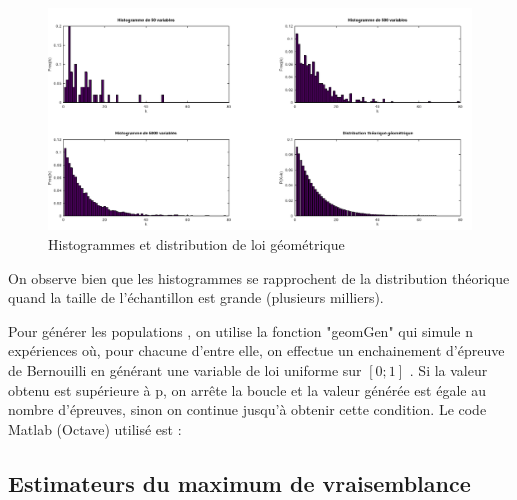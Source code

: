 \documentclass[12pt,a4paper,titlepage]{article}
\begin{document}
\begin{figure}[!h]
\begin{center}
 \includegraphics[scale=0.3]{images/histGeom.png} 
\end{center}
 \caption{Histogrammes et distribution de loi géométrique}
 \label{Histogrammes et distribution de loi géométrique}
\end{figure}

On observe bien que les histogrammes se rapprochent de la distribution théorique quand
la taille de l'échantillon est grande (plusieurs milliers).

Pour générer les populations , on utilise la fonction "geomGen" qui simule
n expériences où, pour chacune d'entre elle, on effectue un enchainement
d'épreuve de Bernouilli en générant une variable de loi uniforme sur
$[0;1]$ . Si la valeur obtenu est supérieure à p, on arrête la boucle
et la valeur générée est égale au nombre d'épreuves, sinon on continue 
jusqu'à obtenir cette condition. Le code Matlab (Octave) utilisé est :




\subsection{Estimateurs du maximum de vraisemblance}
\end{document}
